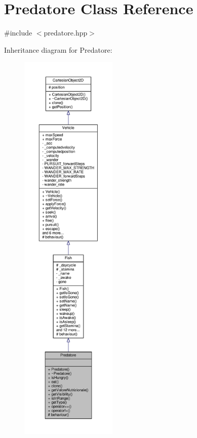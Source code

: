 \hypertarget{classPredatore}{}\section{Predatore Class Reference}
\label{classPredatore}


{\ttfamily \#include $<$predatore.\+hpp$>$}



Inheritance diagram for Predatore\+:\nopagebreak
\begin{figure}[H]
\begin{center}
\leavevmode
\includegraphics[height=550pt]{classPredatore__inherit__graph}
\end{center}
\end{figure}


